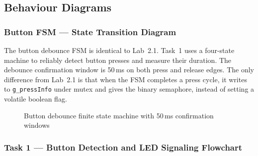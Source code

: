 \subsection{Behaviour Diagrams}

\subsubsection{Button FSM --- State Transition Diagram}

The button debounce FSM is identical to Lab~2.1. Task~1 uses a four-state machine to reliably detect button presses and measure their duration. The debounce confirmation window is 50\,ms on both press and release edges. The only difference from Lab~2.1 is that when the FSM completes a press cycle, it writes to \texttt{g\_pressInfo} under mutex and gives the binary semaphore, instead of setting a volatile boolean flag.

\begin{figure}[H]
\centering
{}
\caption{Button debounce finite state machine with 50\,ms confirmation windows}
\label{fig:button_fsm}
\end{figure}

\subsubsection{Task 1 --- Button Detection and LED Signaling Flowchart}

